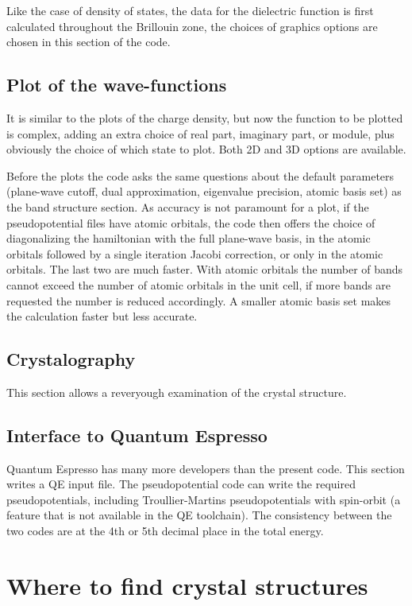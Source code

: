 \documentclass[11pt]{article}
\begin{document}
Like the case of density of states, the data for the dielectric function
is first calculated throughout the Brillouin zone,
the choices of graphics options are chosen in this section of the code.

\subsection{Plot of the wave-functions}

It is similar to the plots of the charge density, but now the function
to be plotted is complex, adding an extra choice of real part, imaginary part,
or module, plus obviously the choice of which state to plot.
Both 2D and 3D options are available.

Before the plots the code asks the same questions about the default parameters
(plane-wave cutoff, dual approximation, eigenvalue precision, atomic basis set)
as the band structure section.
As accuracy is not paramount for a plot, if the pseudopotential files have atomic orbitals,
the code then offers the choice of diagonalizing the hamiltonian with the full plane-wave basis,
in the atomic orbitals followed by a single iteration Jacobi correction, or only in the atomic orbitals.
The last two are much faster.  With atomic orbitals the number of bands cannot exceed the number of
atomic orbitals in the unit cell, if more bands are requested the number is reduced accordingly.
A smaller atomic basis set makes the calculation faster but less accurate.

\subsection{Crystalography}

This section allows a reveryough examination of the crystal structure.

\subsection{Interface to Quantum Espresso}

Quantum Espresso has many more developers than the present code.
This section writes a QE input file.  The pseudopotential
code can write the required pseudopotentials,
including Troullier-Martins pseudopotentials with spin-orbit
(a feature that is not available in the QE toolchain).
The consistency between the two codes are at the 4th or 5th decimal
place in the total energy.

\section{Where to find crystal structures}
\end{document}
